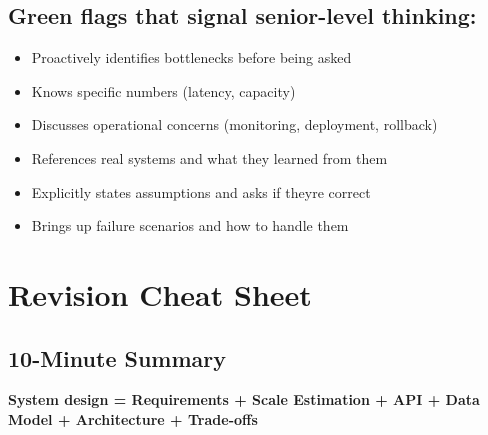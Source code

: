 \documentclass[11pt]{article}
\providecommand{\tightlist}{\setlength{\itemsep}{1pt}\setlength{\parskip}{0pt}}
\begin{document}
\subsection{Green flags that signal senior-level thinking:}\label{green-flags-that-signal-senior-level-thinking}

\begin{itemize}
\tightlist
\item
  Proactively identifies bottlenecks before being asked
\item
  Knows specific numbers (latency, capacity)
\item
  Discusses operational concerns (monitoring, deployment, rollback)
\item
  References real systems and what they learned from them
\item
  Explicitly states assumptions and asks if they\textquotesingle re correct
\item
  Brings up failure scenarios and how to handle them
\end{itemize}

\section{Revision Cheat Sheet}\label{revision-cheat-sheet}

\subsection{10-Minute Summary}\label{10-minute-summary}

\textbf{System design = Requirements + Scale Estimation + API + Data Model + Architecture + Trade-offs}
\end{document}
